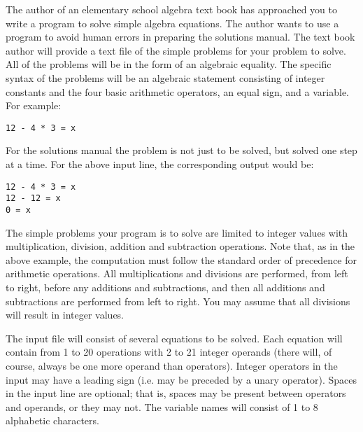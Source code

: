 


\pagestyle{contest}


\maketitle


The author of an elementary school algebra text book has approached
you to write a program to solve simple algebra equations.  The author
wants to use a program to avoid human errors in preparing the
solutions manual.  The text book author will provide a text file of
the simple problems for your problem to solve.  All of the problems
will be in the form of an algebraic equality.  The specific syntax of
the problems will be an algebraic statement consisting of integer
constants and the four basic arithmetic operators, an equal sign, and
a variable.  For example:

\begin{verbatim}
12 - 4 * 3 = x
\end{verbatim}

For the solutions manual the problem is not just to be solved, but solved
one step at a time.  For the above input line, the corresponding output 
would be:

\begin{verbatim}
12 - 4 * 3 = x
12 - 12 = x
0 = x
\end{verbatim}

The simple problems your program is to solve are limited to integer
values with multiplication, division, addition and subtraction
operations.  Note that, as in the above example, the computation must
follow the standard order of precedence for arithmetic operations.
All multiplications and divisions are performed, from left to right,
before any additions and subtractions, and then all additions and
subtractions are performed from left to right.  You may assume that
all divisions will result in integer values.

\bigskip
{}

The input file will consist of several equations to be solved.  Each
equation will contain from 1 to 20 operations with 2 to 21 integer
operands (there will, of course, always be one more operand than
operators).  Integer operators in the input may have a leading sign
(i.e. may be preceded by a unary operator).  Spaces in the input line
are optional; that is, spaces may be present between operators and
operands, or they may not.  The variable names will consist of 1 to 8
alphabetic characters.

